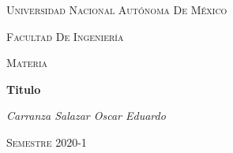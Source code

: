 \documentclass[11pt, letterpaper]{report}
\begin{document}
\begin{titlepage}
	\centering
	{\scshape\LARGE Universidad Nacional Autónoma De México \par}
	\vspace{1cm}
	{\scshape\LARGE Facultad De Ingeniería \par}
	\vspace{1cm}
	{\scshape\Large Materia \par}
	\vspace{1cm}
	\hrulefill\par
	{\huge\bfseries Titulo \par}
	\hrulefill\par
	\vspace{1cm}
	{\Large\itshape Carranza Salazar Oscar Eduardo\par}
		\vfill
		\vfill		
	{\scshape\Large Semestre 2020-1\par}
\end{titlepage}
\end{document}
